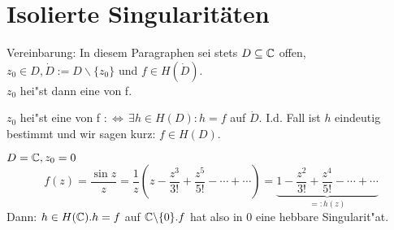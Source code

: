 \documentclass[a4paper,twoside,DIV15,BCOR12mm]{scrbook}
\begin{document}
%
%



\chapter{Isolierte Singularitäten}

Vereinbarung: In diesem Paragraphen sei stets $D \subseteq \mathbb{C}$ offen, $z_0 \in D, \dot{D} := D \backslash \{z_0\}$ und $f \in H(\dot{D})$.\\
$z_0$ hei"st dann eine  von f.

\begin{definition}
$z_0$ hei"st eine  von f $:\Leftrightarrow \, \exists h\in H(D): h=f$ auf $\dot{D}$. I.d. Fall ist $h$ eindeutig bestimmt und wir sagen kurz: $f \in H(D)$.
\end{definition}

\begin{beispiel}
$D=\mathbb{C}, z_0=0$
\[
f(z) = \frac{\sin z}{z} = \frac1z\left(z - \frac{z^3}{3!} + \frac{z^5}{5!} - \cdots + \cdots \right) = \underbrace{1 - \frac{z^2}{3!} + \frac{z^4}{5!} - \cdots + \cdots}_{=:h(z)}
\]
Dann: $h \in H(\mathbb{C}). h=f$ auf $\mathbb{C} \backslash\{0\}. f$ hat also in $0$ eine hebbare Singularit"at.
\end{beispiel}
\end{document}
